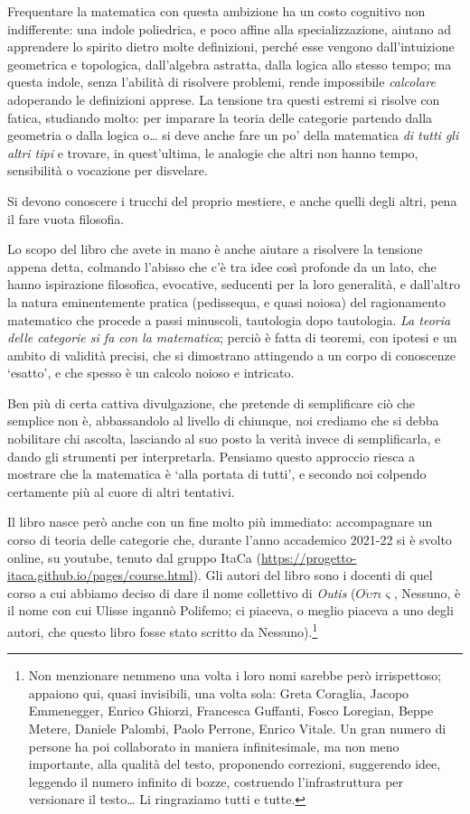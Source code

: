 Frequentare la matematica con questa ambizione ha un costo cognitivo non indifferente: una indole poliedrica, e poco affine alla specializzazione, aiutano ad apprendere lo spirito dietro molte definizioni, perché esse vengono dall'intuizione geometrica e topologica, dall'algebra astratta, dalla logica allo stesso tempo; ma questa indole, senza l'abilità di risolvere problemi, rende impossibile \emph{calcolare} adoperando le definizioni apprese. La tensione tra questi estremi si risolve con fatica, studiando molto: per imparare la teoria delle categorie partendo dalla geometria o dalla logica o\dots{} si deve anche fare un po' della matematica \emph{di tutti gli altri tipi} e trovare, in quest'ultima, le analogie che altri non hanno tempo, sensibilità o vocazione per disvelare. 

Si devono conoscere i trucchi del proprio mestiere, e anche quelli degli altri, pena il fare vuota filosofia.

Lo scopo del libro che avete in mano è anche aiutare a risolvere la tensione appena detta, colmando l'abisso che c'è tra idee così profonde da un lato, che hanno ispirazione filosofica, evocative, seducenti per la loro generalità, e dall'altro la natura eminentemente pratica (pedissequa, e quasi noiosa) del ragionamento matematico che procede a passi minuscoli, tautologia dopo tautologia. \emph{La teoria delle categorie si fa con la matematica}; perciò è fatta di teoremi, con ipotesi e un ambito di validità precisi, che si dimostrano attingendo a un corpo di conoscenze `esatto', e che spesso è un calcolo noioso e intricato.

Ben più di certa cattiva divulgazione, che pretende di semplificare ciò che semplice non è, abbassandolo al livello di chiunque, noi crediamo che si debba nobilitare chi ascolta, lasciando al suo posto la verità invece di semplificarla, e dando gli strumenti per interpretarla. Pensiamo questo approccio riesca a mostrare che la matematica è `alla portata di tutti', e secondo noi colpendo certamente più al cuore di altri tentativi.

\medskip
Il libro nasce però anche con un fine molto più immediato: accompagnare un corso di teoria delle categorie che, durante l'anno accademico 2021-22 si è svolto online, su youtube, tenuto dal gruppo ItaCa (\url{https://progetto-itaca.github.io/pages/course.html}). Gli autori del libro sono i docenti di quel corso a cui abbiamo deciso di dare il nome collettivo di \emph{Outis} (\(O \acute\upsilon\tau\iota\varsigma\), Nessuno, è il nome con cui Ulisse ingannò Polifemo; ci piaceva, o meglio piaceva a uno degli autori, che questo libro fosse stato scritto da Nessuno).\footnote{Non menzionare nemmeno una volta i loro nomi sarebbe però irrispettoso; appaiono qui, quasi invisibili, una volta sola:
 Greta Coraglia, Jacopo Emmenegger, Enrico Ghiorzi, Francesca Guffanti, Fosco Loregian, Beppe Metere, Daniele Palombi, Paolo Perrone, Enrico Vitale. Un gran numero di persone ha poi collaborato in maniera infinitesimale, ma non meno importante, alla qualità del testo, proponendo correzioni, suggerendo idee, leggendo il numero infinito di bozze, costruendo l'infrastruttura per versionare il testo\dots{} Li ringraziamo tutti e tutte.}

